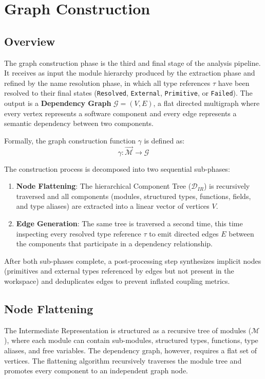 \chapter{Graph Construction}
\label{ch:graph_construction}

\section{Overview}
\label{sec:graph_overview}

The graph construction phase is the third and final stage of the analysis pipeline. It receives as input the module hierarchy produced by the extraction phase and refined by the name resolution phase, in which all type references $\tau$ have been resolved to their final states (\texttt{Resolved}, \texttt{External}, \texttt{Primitive}, or \texttt{Failed}). The output is a \textbf{Dependency Graph} $\mathcal{G} = (V, E)$, a flat directed multigraph where every vertex represents a software component and every edge represents a semantic dependency between two components.

Formally, the graph construction function $\gamma$ is defined as:
$$\gamma : \vec{\mathcal{M}} \to \mathcal{G}$$

The construction process is decomposed into two sequential sub-phases:
\begin{enumerate}
  \item \textbf{Node Flattening}: The hierarchical Component Tree ($\mathcal{D}_{IR}$) is recursively traversed and all components (modules, structured types, functions, fields, and type aliases) are extracted into a linear vector of vertices $V$.
  \item \textbf{Edge Generation}: The same tree is traversed a second time, this time inspecting every resolved type reference $\tau$ to emit directed edges $E$ between the components that participate in a dependency relationship.
\end{enumerate}

After both sub-phases complete, a post-processing step synthesizes implicit nodes (primitives and external types referenced by edges but not present in the workspace) and deduplicates edges to prevent inflated coupling metrics.

\section{Node Flattening}
\label{sec:node_flattening}

The Intermediate Representation is structured as a recursive tree of modules ($\mathcal{M}$), where each module can contain sub-modules, structured types, functions, type aliases, and free variables. The dependency graph, however, requires a flat set of vertices. The flattening algorithm recursively traverses the module tree and promotes every component to an independent graph node.

